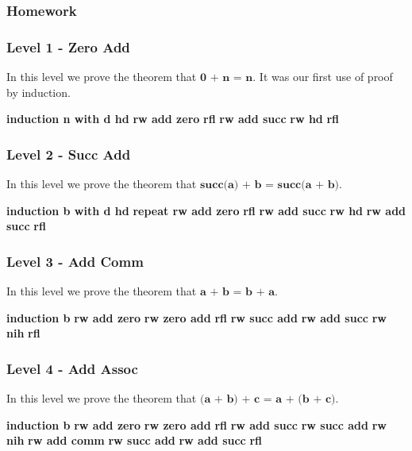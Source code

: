 \documentclass{article}
\theoremstyle{theorem}
\theoremstyle{definition}
\theoremstyle{remark}
\begin{document}

\subsubsection*{Homework}

\subsubsection*{Level 1 - Zero Add}
  In this level we prove the theorem that $\textbf{0 + n = n}$. It was our first use of proof by induction.

  \bgroup\obeylines
  \qquad \textbf{induction n with d hd}
  \qquad \textbf{rw add zero}
  \qquad \textbf{rfl}
  \qquad \textbf{rw add succ}
  \qquad \textbf{rw hd}
  \qquad \textbf{rfl}
  \egroup

  \subsubsection*{Level 2 - Succ Add}
  In this level we prove the theorem that $\textbf{succ(a) + b = succ(a + b)}$.

  \bgroup\obeylines
  \qquad \textbf{induction b with d hd}
  \qquad \textbf{repeat rw add zero}
  \qquad \textbf{rfl}
  \qquad \textbf{rw add succ}
  \qquad \textbf{rw hd}
  \qquad \textbf{rw add succ}
  \qquad \textbf{rfl}
  \egroup

  \subsubsection*{Level 3 - Add Comm}
  In this level we prove the theorem that $\textbf{a + b = b + a}$.

  \bgroup\obeylines
  \qquad \textbf{induction b}
  \qquad \textbf{rw add zero}
  \qquad \textbf{rw zero add}
  \qquad \textbf{rfl}
  \qquad \textbf{rw succ add}
  \qquad \textbf{rw add succ}
  \qquad \textbf{rw nih}
  \qquad \textbf{rfl}
  \egroup

  \subsubsection*{Level 4 - Add Assoc}
  In this level we prove the theorem that $\textbf{(a + b) + c = a + (b + c)}$.

  \bgroup\obeylines
  \qquad \textbf{induction b}
  \qquad \textbf{rw add zero}
  \qquad \textbf{rw zero add}
  \qquad \textbf{rfl}
  \qquad \textbf{rw add succ}
  \qquad \textbf{rw succ add}
  \qquad \textbf{rw nih}
  \qquad \textbf{rw add comm}
  \qquad \textbf{rw succ add}
  \qquad \textbf{rw add succ}
  \qquad \textbf{rfl}
  \egroup
\end{document}
